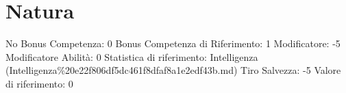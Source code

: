 \section{Natura}\label{natura}

\begin{description}
\tightlist
\item[Tags: ABI]
No Bonus Competenza: 0 Bonus Competenza di Riferimento: 1 Modificatore:
-5 Modificatore Abilità: 0 Statistica di riferimento: Intelligenza
(Intelligenza\%20e22f806df5dc461f8dfaf8a1e2edf43b.md) Tiro Salvezza: -5
Valore di riferimento: 0
\end{description}
